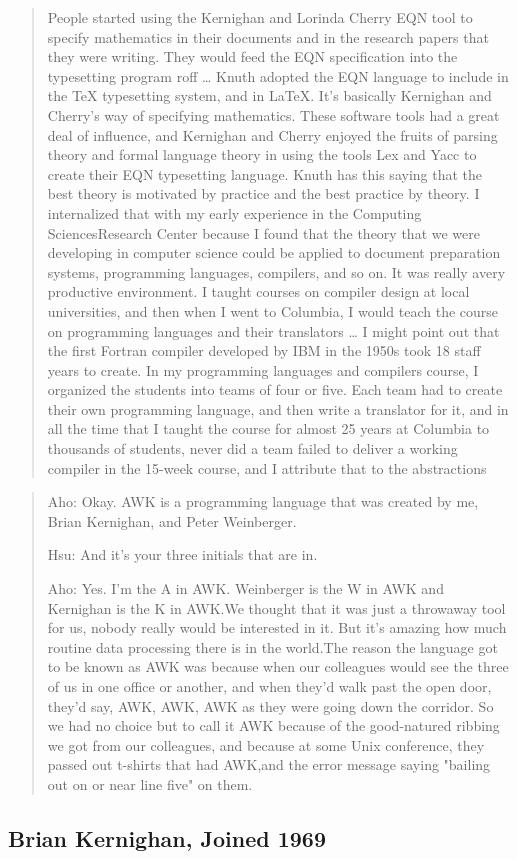 \begin{quotation}
    People started using the Kernighan and Lorinda Cherry EQN tool to specify mathematics in their 
documents and in the research papers that they were writing. They would feed the EQN specification 
into the typesetting program roff
\dots
Knuth adopted the EQN language to include in the TeX typesetting system, and in LaTeX. It's 
basically Kernighan and Cherry's way of specifying mathematics. These software tools had a great 
deal of influence, and Kernighan and Cherry enjoyed the fruits of parsing theory and formal language 
theory in using the tools Lex and Yacc to create their EQN typesetting language. Knuth has this 
saying that the best theory is motivated by practice and the best practice by theory. I internalized 
that with my early experience in the Computing SciencesResearch Center because I found that the 
theory that we were developing in computer science could be applied to document preparation systems, 
programming languages, compilers, and so on. It was really avery productive environment. I taught 
courses on compiler design at local universities, and then when I went to Columbia, I would teach 
the course on programming languages and their translators
\dots
I might point out that the first Fortran compiler developed by IBM in the 1950s took 18 staff years 
to create. In my programming languages and compilers course, I organized the students into teams of 
four or five. Each team had to create their own programming language, and then write a translator 
for it, and in all the time that I taught the course for almost 25 years at Columbia to thousands of 
students, never did a team failed to deliver a working compiler in the 15-week course, and I 
attribute that to the abstractions
\cite{aho_oral_history_2022}
\end{quotation}
\begin{quotation}
    Aho: Okay. AWK is a programming language that was created by me, Brian 
Kernighan, and Peter Weinberger.

Hsu: And it's your three initials that are in.

Aho: Yes. I'm the A in AWK. Weinberger is the W in AWK and Kernighan is the 
K in AWK.We thought that it was just a throwaway tool for us, nobody really 
would be interested in it. But it's amazing how much routine data processing 
there is in the world.The reason the language got to be known as AWK was because 
when our colleagues would see the three of us in one office or another, and when 
they'd walk past the open door, they'd say, AWK, AWK, AWK as they were going 
down the corridor. So we had no choice but to call it AWK because of the 
good-natured ribbing we got from our colleagues, and because at some Unix 
conference, they passed out t-shirts that had AWK,and the error message saying 
"bailing out on or near line five" on them.
\end{quotation}



\subsection{Brian Kernighan, Joined 1969}
